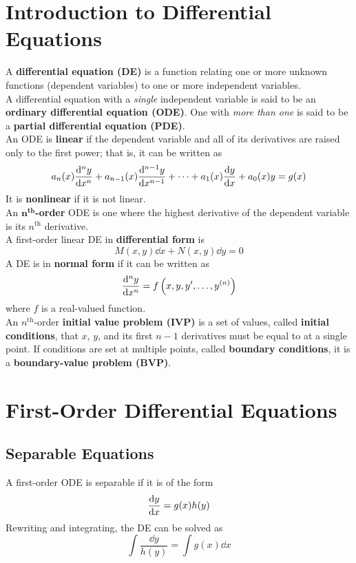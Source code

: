 \documentclass[12pt, A4]{article}
\newcommand{\supt}[2]{#1^{\text{#2}}}
\begin{document}
	\section{Introduction to Differential Equations}
		A \textbf{differential equation (DE)} is a function relating one or more unknown functions (dependent variables) to one or more independent variables. \\
		A differential equation with a \textit{single} independent variable is said to be an \textbf{ordinary differential equation (ODE)}. One with \textit{more than one} is said to be a \textbf{partial differential equation (PDE)}. \\
		An ODE is \textbf{linear} if the dependent variable and all of its derivatives are raised only to the first power; that is, it can be written as
			\[a_n(x)\dv[n]{y}{x} + a_{n - 1}(x)\dv[n - 1]{y}{x} + \cdots + a_1(x)\dv{y}{x} + a_0(x)y = g(x)\]
			It is \textbf{nonlinear} if it is not linear. \\
		An \textbf{\(\bm{\supt{n}{th}}\)-order} ODE is one where the highest derivative of the dependent variable is its \(\supt{n}{th}\) derivative. \\
		A first-order linear DE in \textbf{differential form} is 
			\[M(x, y)\dd{x} + N(x, y)\dd{y} = 0\]
		A DE is in \textbf{normal form} if it can be written as
			\[\dv[n]{y}{x} = f\left(x, y, y', \ldots, y^{(n)}\right)\]
			where \(f\) is a real-valued function. \\
		An \(\supt{n}{th}\)-order \textbf{initial value problem (IVP)} is a set of values, called \textbf{initial conditions}, that \(x\), \(y\), and its first \(n - 1\) derivatives must be equal to at a single point. If conditions are set at multiple points, called \textbf{boundary conditions}, it is a \textbf{boundary-value problem (BVP)}.
	\section{First-Order Differential Equations}
		\subsection{Separable Equations}
			A first-order ODE is separable if it is of the form
				\[\dv{y}{x} = g(x)h(y)\]
				Rewriting and integrating, the DE can be solved as
				\[\int \frac{\dd{y}}{h(y)} = \int g(x)\dd{x}\]
\end{document}
